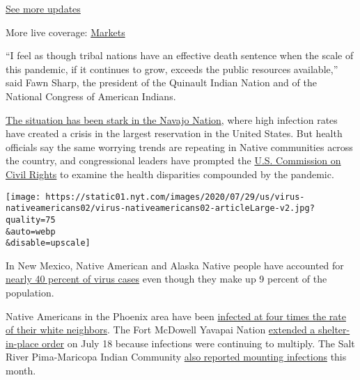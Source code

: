 \href{https://www.nytimes.com/2020/08/04/world/coronavirus-cases.html?action=click\&pgtype=Article\&state=default\&region=MAIN_CONTENT_1\&context=storylines_live_updates}{See
more updates}

More live coverage:
\href{https://www.nytimes.com/live/2020/08/04/business/stock-market-today-coronavirus?action=click\&pgtype=Article\&state=default\&region=MAIN_CONTENT_1\&context=storylines_live_updates}{Markets}

``I feel as though tribal nations have an effective death sentence when
the scale of this pandemic, if it continues to grow, exceeds the public
resources available,'' said Fawn Sharp, the president of the Quinault
Indian Nation and of the National Congress of American Indians.

\href{https://www.nytimes.com/2020/04/09/us/coronavirus-navajo-nation.html}{The
situation has been stark in the Navajo Nation}, where high infection
rates have created a crisis in the largest reservation in the United
States. But health officials say the same worrying trends are repeating
in Native communities across the country, and congressional leaders have
prompted the
\href{https://www.warren.senate.gov/newsroom/press-releases/us-commission-on-civil-rights-agrees-to-warren-haaland-request-to-update-broken-promises-report-and-examine-pandemic-impacts-on-indian-country}{U.S.
Commission on Civil Rights} to examine the health disparities compounded
by the pandemic.

\texttt{[image: https://static01.nyt.com/images/2020/07/29/us/virus-nativeamericans02/virus-nativeamericans02-articleLarge-v2.jpg?quality=75\\\&auto=webp\\\&disable=upscale]}

In New Mexico, Native American and Alaska Native people have accounted
for \href{https://cvprovider.nmhealth.org/public-dashboard.html}{nearly
40 percent of virus cases} even though they make up 9 percent of the
population.

Native Americans in the Phoenix area have been
\href{https://phdata.maricopa.gov/Dashboard/e10a16d8-921f-4aac-b921-26d95e638a45?e=false\&vo=viewonly}{infected
at four times the rate of their white neighbors}. The Fort McDowell
Yavapai Nation
\href{https://www.fmyn.org/tribal-member-letter-extending-shelter-in-place-order-and-tribal-govt-closure/}{extended
a shelter-in-place order} on July 18 because infections were continuing
to multiply. The Salt River Pima-Maricopa Indian Community
\href{https://oan.srpmic-nsn.gov/archives/2020/PDFs/OAN_JULY162020_FINAL.pdf}{also
reported mounting infections} this month.

